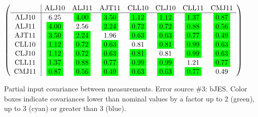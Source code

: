 \begin{table}[H]
\scriptsize
\begin{center}
\renewcommand{\arraystretch}{1.1}
\begin{math}\left(\begin{array}{c|ccccccc}
 & \mathrm{ALJ10} & 
\mathrm{ALJ11} & 
\mathrm{AJT11} & 
\mathrm{CLL10} & 
\mathrm{CLJ10} & 
\mathrm{CLL11} & 
\mathrm{CMJ11} \\
\hline
\mathrm{ALJ10} \hspace*{2pt} &       6.25 &  \colorbox{Green1}{$      4.00$} &  \colorbox{Green1}{$      3.50$} &  \colorbox{Green1}{$      1.12$} &  \colorbox{Green1}{$      1.12$} &  \colorbox{Green1}{$      1.37$} &  \colorbox{Green1}{$      0.87$} \\
\mathrm{ALJ11} \hspace*{2pt} &  \colorbox{Green1}{$      4.00$} &       2.56 &  \colorbox{Green1}{$      2.24$} &  \colorbox{Green1}{$      0.72$} &  \colorbox{Green1}{$      0.72$} &  \colorbox{Green1}{$      0.88$} &  \colorbox{Green1}{$      0.56$} \\
\mathrm{AJT11} \hspace*{2pt} &  \colorbox{Green1}{$      3.50$} &  \colorbox{Green1}{$      2.24$} &       1.96 &  \colorbox{Green1}{$      0.63$} &  \colorbox{Green1}{$      0.63$} &  \colorbox{Green1}{$      0.77$} &  \colorbox{Green1}{$      0.49$} \\
\mathrm{CLL10} \hspace*{2pt} &  \colorbox{Green1}{$      1.12$} &  \colorbox{Green1}{$      0.72$} &  \colorbox{Green1}{$      0.63$} &       0.81 &  \colorbox{Green1}{$      0.81$} &  \colorbox{Green1}{$      0.99$} &  \colorbox{Green1}{$      0.63$} \\
\mathrm{CLJ10} \hspace*{2pt} &  \colorbox{Green1}{$      1.12$} &  \colorbox{Green1}{$      0.72$} &  \colorbox{Green1}{$      0.63$} &  \colorbox{Green1}{$      0.81$} &       0.81 &  \colorbox{Green1}{$      0.99$} &  \colorbox{Green1}{$      0.63$} \\
\mathrm{CLL11} \hspace*{2pt} &  \colorbox{Green1}{$      1.37$} &  \colorbox{Green1}{$      0.88$} &  \colorbox{Green1}{$      0.77$} &  \colorbox{Green1}{$      0.99$} &  \colorbox{Green1}{$      0.99$} &       1.21 &  \colorbox{Green1}{$      0.77$} \\
\mathrm{CMJ11} \hspace*{2pt} &  \colorbox{Green1}{$      0.87$} &  \colorbox{Green1}{$      0.56$} &  \colorbox{Green1}{$      0.49$} &  \colorbox{Green1}{$      0.63$} &  \colorbox{Green1}{$      0.63$} &  \colorbox{Green1}{$      0.77$} &       0.49 \\
\end{array}\right)\end{math}
\caption{Partial input covariance between measurements. Error source \#3: bJES. Color boxes indicate covariances lower than nominal values by a factor up to 2 (green), up to 3 (cyan) or greater than 3 (blue).}
\renewcommand{\arraystretch}{1}
\end{center}
\end{table}
